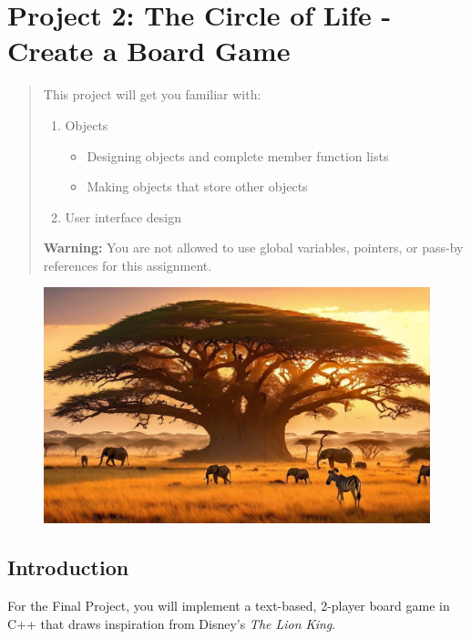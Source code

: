 \chapter*{Project 2: The Circle of Life - Create a Board Game}
\setcounter{chapter}{8}
\setcounter{section}{0}

\begin{abstract}
This project will get you familiar with:
\begin{enumerate}
    \item Objects
    \begin{itemize}
        \item Designing objects and complete member function lists
        \item Making objects that store other objects
    \end{itemize}
    \item User interface design
\end{enumerate}

\textbf{Warning:} You are not allowed to use global variables, pointers, or pass-by references for this assignment.

\end{abstract}

\begin{figure}[h!]
    \centering
    \includegraphics[width=0.75\linewidth]{images/Savanna.jpg}
\end{figure}


\section{\textbf{Introduction}}

For the Final Project, you will implement a text-based, 2-player board game in C++ that draws inspiration from Disney's \textit{The Lion King}. 

